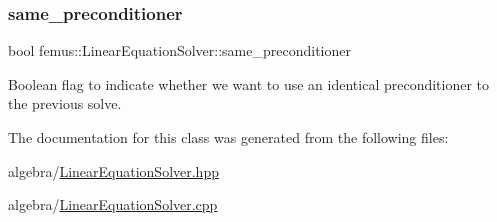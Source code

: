 \subsubsection{\texorpdfstring{same\+\_\+preconditioner}{same\_preconditioner}}
{\footnotesize\ttfamily bool femus\+::\+Linear\+Equation\+Solver\+::same\+\_\+preconditioner\hspace{0.3cm}{\ttfamily [protected]}}



Boolean flag to indicate whether we want to use an identical preconditioner to the previous solve. 



The documentation for this class was generated from the following files\+:\begin{DoxyCompactItemize}
\item 
algebra/\mbox{\hyperlink{_linear_equation_solver_8hpp}{Linear\+Equation\+Solver.\+hpp}}\item 
algebra/\mbox{\hyperlink{_linear_equation_solver_8cpp}{Linear\+Equation\+Solver.\+cpp}}\end{DoxyCompactItemize}
